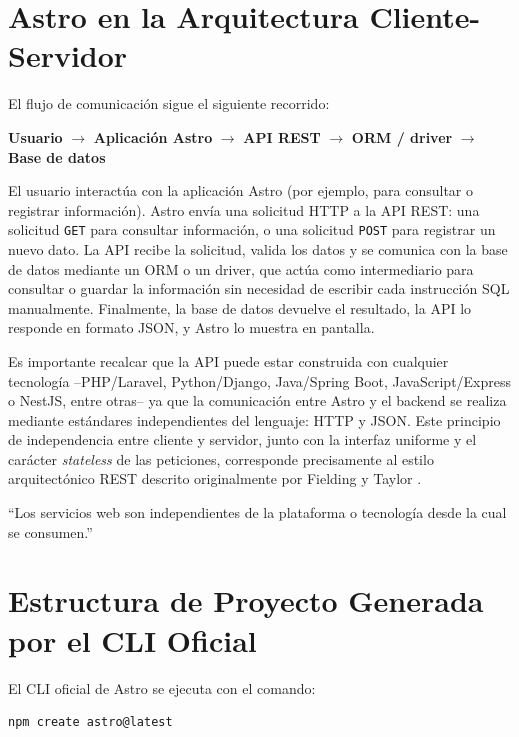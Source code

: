 \documentclass[12pt]{article}
\begin{document}
\section{Astro en la Arquitectura Cliente-Servidor}

El flujo de comunicación sigue el siguiente recorrido:

\begin{center}
\textbf{Usuario} $\rightarrow$ \textbf{Aplicación Astro} $\rightarrow$ \textbf{API REST} $\rightarrow$ \textbf{ORM / driver} $\rightarrow$ \textbf{Base de datos}
\end{center}

El usuario interactúa con la aplicación Astro (por ejemplo, para consultar o registrar información). Astro envía una solicitud HTTP a la API REST: una solicitud \texttt{GET} para consultar información, o una solicitud \texttt{POST} para registrar un nuevo dato. La API recibe la solicitud, valida los datos y se comunica con la base de datos mediante un ORM o un driver, que actúa como intermediario para consultar o guardar la información sin necesidad de escribir cada instrucción SQL manualmente. Finalmente, la base de datos devuelve el resultado, la API lo responde en formato JSON, y Astro lo muestra en pantalla.

Es importante recalcar que la API puede estar construida con cualquier tecnología --PHP/Laravel, Python/Django, Java/Spring Boot, JavaScript/Express o NestJS, entre otras-- ya que la comunicación entre Astro y el backend se realiza mediante estándares independientes del lenguaje: HTTP y JSON. Este principio de independencia entre cliente y servidor, junto con la interfaz uniforme y el carácter \textit{stateless} de las peticiones, corresponde precisamente al estilo arquitectónico REST descrito originalmente por Fielding y Taylor \parencite{fielding2002principled}.

\begin{displayquote}
``Los servicios web son independientes de la plataforma o tecnología desde la cual se consumen.''
\end{displayquote}

\section{Estructura de Proyecto Generada por el CLI Oficial}

El CLI oficial de Astro se ejecuta con el comando:

\begin{lstlisting}[style=bash, language=bash]
npm create astro@latest
\end{lstlisting}
\end{document}
